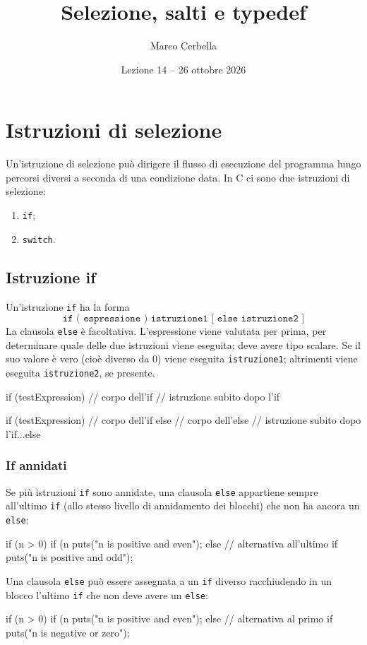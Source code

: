 \documentclass[11pt,a4paper]{article}
\title{Selezione, salti e typedef}
\author{Marco Cerbella}
\date{Lezione 14 -- 26 ottobre 2026}
\begin{document}
\maketitle

\section{Istruzioni di selezione}

Un'istruzione di selezione può dirigere il flusso di esecuzione del programma lungo percorsi diversi a seconda di una condizione data. In C ci sono due istruzioni di selezione:
\begin{enumerate}
    \item \lstinline|if|;
    \item \lstinline|switch|.
\end{enumerate}

\subsection{Istruzione if}

Un'istruzione \lstinline|if| ha la forma
\[
\texttt{if ( espressione ) istruzione1 [ else istruzione2 ]}
\]
La clausola \lstinline|else| è facoltativa. L'espressione viene valutata per prima, per determinare quale delle due istruzioni viene eseguita; deve avere tipo scalare. Se il suo valore è vero (cioè diverso da $0$) viene eseguita \texttt{istruzione1}; altrimenti viene eseguita \texttt{istruzione2}, se presente.

\begin{codice}
if (testExpression)
{
    // corpo dell'if
}
// istruzione subito dopo l'if
\end{codice}
\begin{codice}
if (testExpression)
{
    // corpo dell'if
}
else
{
    // corpo dell'else
}
// istruzione subito dopo l'if...else
\end{codice}

\subsubsection*{If annidati}

Se più istruzioni \lstinline|if| sono annidate, una clausola \lstinline|else| appartiene sempre all'ultimo \lstinline|if| (allo stesso livello di annidamento dei blocchi) che non ha ancora un \lstinline|else|:
\begin{codice}
if (n > 0)
    if (n %
        puts("n is positive and even");
    else    // alternativa all'ultimo if
        puts("n is positive and odd");
\end{codice}
Una clausola \lstinline|else| può essere assegnata a un \lstinline|if| diverso racchiudendo in un blocco l'ultimo \lstinline|if| che non deve avere un \lstinline|else|:
\begin{codice}
if (n > 0)
{
    if (n %
        puts("n is positive and even");
}
else        // alternativa al primo if
    puts("n is negative or zero");
\end{codice}
\end{document}
